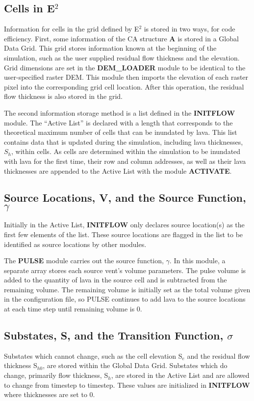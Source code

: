 	\subsection[Cells in E2]{Cells in E$^2$}
		Information for cells in the grid defined by E$^2$ is stored in two ways, for code efficiency. First, some information of the CA structure \textbf{A} is stored in a Global Data Grid. This grid stores information known at the beginning of the simulation, such as the user supplied residual flow thickness and the elevation. Grid dimensions are set in the \textbf{DEM\_LOADER} module to be identical to the user-specified raster DEM. This module then imports the elevation of each raster pixel into the corresponding grid cell location. After this operation, the residual flow thickness is also stored in the grid.

		The second information storage method is a list defined in the \textbf{INITFLOW} module. The ``Active List'' is declared with a length that corresponds to the theoretical maximum number of cells that can be inundated by lava. This list contains data that is updated during the simulation, including lava thicknesses, $S_h$, within cells. As cells are determined within the simulation to be inundated with lava for the first time, their row and column addresses, as well as their lava thicknesses are appended to the Active List with the module \textbf{ACTIVATE}.
		
	\subsection[Source Locations and the Source Function]{Source Locations, V, and the Source Function, $\gamma$}
		Initially in the Active List, \textbf{INITFLOW} only declares source location(s) as the first few elements of the list. These source locations are flagged in the list to be identified as source locations by other modules.

		The \textbf{PULSE} module carries out the source function, $\gamma$. In this module, a separate array stores each source vent's volume parameters. The pulse volume is added to the quantity of lava in the source cell and is subtracted from the remaining volume. The remaining volume is initially set as the total volume given in the configuration file, so PULSE continues to add lava to the source locations at each time step until remaining volume is 0.
		
	\subsection[Substates and the Transition Function]{Substates, S, and the Transition Function, $\sigma$}
		Substates which cannot change, such as the cell elevation S$_e$ and the residual flow thickness S$_{h0}$, are stored within the Global Data Grid. Substates which do change, primarily flow thickness, S$_h$, are stored in the Active List and are allowed to change from timestep to timestep. These values are initialized in \textbf{INITFLOW} where thicknesses are set to 0.
		
